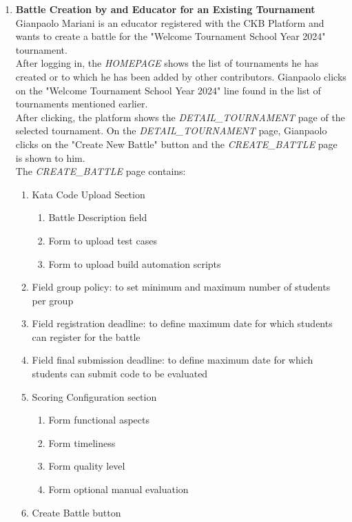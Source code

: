 \begin{enumerate}
    	
    	
    \item \textbf{Battle Creation by and Educator for an Existing Tournament}\\
    	Gianpaolo Mariani is an educator registered with the CKB Platform and wants to create a battle for the "Welcome Tournament School Year 2024" tournament.\\
    	After logging in, the \emph{HOMEPAGE} shows the list of tournaments he has created or to which he has been added by other contributors. Gianpaolo clicks on the "Welcome 
    	Tournament School Year 2024" line found in the list of tournaments mentioned earlier.\\
    	After clicking, the platform shows the \emph{DETAIL\_TOURNAMENT} page of the selected tournament.
    	On the \emph{DETAIL\_TOURNAMENT} page, Gianpaolo clicks on the "Create New Battle" button and the \emph{CREATE\_BATTLE} page is shown to him.\\
    	The \emph{CREATE\_BATTLE} page contains:

		\begin{enumerate}
			\item Kata Code Upload Section
				\begin{enumerate}
					\item Battle Description field
					\item Form to upload test cases
					\item Form to upload build automation scripts
				\end{enumerate}
			\item Field group policy: to set minimum and maximum number of students per group
			\item Field registration deadline: to define maximum date for which students can register for the battle
			\item Field final submission deadline: to define maximum date for which students can submit code to be evaluated
			\item Scoring Configuration section

				\begin{enumerate}
					\item Form functional aspects
					\item Form timeliness
					\item Form quality level
					\item Form optional manual evaluation
				\end{enumerate}

			
			\item Create Battle button
		\end{enumerate}
		

\end{enumerate}
